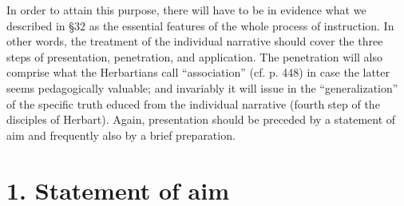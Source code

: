 In order to attain this purpose, there will have to be in evidence what we described in §32 as the essential features of the whole process of instruction. In other words, the treatment of the individual narrative should cover the three steps of presentation, penetration, and application. The penetration will also comprise what the Herbartians call “association” (cf. p. 448) in case the latter seems pedagogically valuable; and invariably it will issue in the “generalization” of the specific truth educed from the individual narrative (fourth step of the disciples of Herbart). Again, presentation should be preceded by a statement of aim and frequently also by a brief preparation.

\section{1. Statement of aim}

